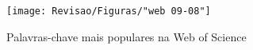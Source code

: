 \begin{figure}[!htb]
	\centering
	\caption{Palavras-chave mais populares na Web of Science}
	\label{fig:web-09-08}
	\texttt{[image: Revisao/Figuras/"web 09-08"]}
	
	
	
\end{figure}